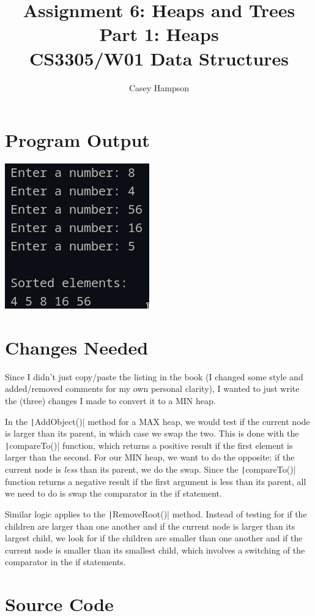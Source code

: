 \documentclass{article}
\title{Assignment 6: Heaps and Trees \\[5pt] Part 1: Heaps \\[8pt] CS3305/W01 Data Structures}
\author{Casey Hampson}
\begin{document}
\maketitle


\section*{Program Output}

\begin{center}
\includegraphics[width=0.4\linewidth]{res/1.png}
\end{center}


\section*{Changes Needed}
Since I didn't just copy/paste the listing in the book (I changed some style and added/removed comments for my own personal clarity), I wanted to just write the (three) changes I made to convert it to a MIN heap.

In the \texttt|AddObject()| method for a MAX heap, we would test if the current node is larger than its parent, in which case we swap the two. This is done with the \texttt|compareTo()| function, which returns a positive result if the first element is larger than the second. For our MIN heap, we want to do the opposite: if the current node is \textit{less} than its parent, we do the swap. Since the \texttt|compareTo()| function returns a negative result if the first argument is less than its parent, all we need to do is swap the comparator in the if statement.

Similar logic applies to the \texttt|RemoveRoot()| method. Instead of testing for if the children are larger than one another and if the current node is larger than its largest child, we look for if the children are smaller than one another and if the current node is smaller than its smallest child, which involves a switching of the comparator in the if statements.



\pagebreak
\section*{Source Code}
\inputminted{java}{./P1.java}
\end{document}
